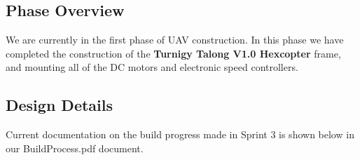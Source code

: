 \subsection{Phase Overview}
We are currently in the first phase of UAV construction. In this phase we have completed the construction of the \textbf{Turnigy Talong V1.0 Hexcopter} frame, and mounting all of the DC motors and electronic speed controllers.
\subsection{Design Details}
Current documentation on the build progress made in Sprint 3 is shown below in our BuildProcess.pdf document.



 
% 
% 
% 
% 

\newpage
